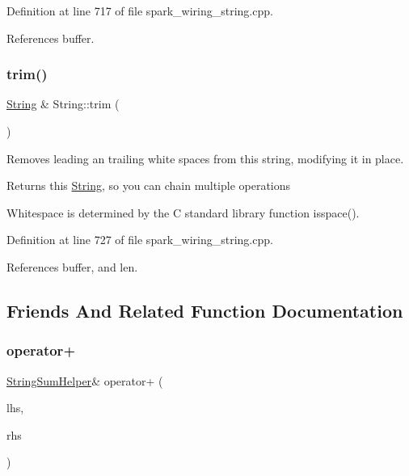 Definition at line 717 of file spark\+\_\+wiring\+\_\+string.\+cpp.



References buffer.

\mbox{\label{class_string_a7b9ef1226bef45dac72045042afc16e8}} 
\subsubsection{\texorpdfstring{trim()}{trim()}}
{\footnotesize\ttfamily \hyperlink{class_string}{String} \& String\+::trim (\begin{DoxyParamCaption}\item[{void}]{ }\end{DoxyParamCaption})}



Removes leading an trailing white spaces from this string, modifying it in place. 

\begin{DoxyReturn}{Returns}
this \hyperlink{class_string}{String}, so you can chain multiple operations
\end{DoxyReturn}
Whitespace is determined by the C standard library function isspace(). 

Definition at line 727 of file spark\+\_\+wiring\+\_\+string.\+cpp.



References buffer, and len.



\subsection{Friends And Related Function Documentation}
\mbox{\label{class_string_a2fb327465c18d4346465237d8a38938c}} 
\subsubsection{\texorpdfstring{operator+}{operator+}\hspace{0.1cm}{\footnotesize\ttfamily [1/10]}}
{\footnotesize\ttfamily \hyperlink{class_string_sum_helper}{String\+Sum\+Helper}\& operator+ (\begin{DoxyParamCaption}\item[{const \hyperlink{class_string_sum_helper}{String\+Sum\+Helper} \&}]{lhs,  }\item[{const \hyperlink{class_string}{String} \&}]{rhs }\end{DoxyParamCaption})\hspace{0.3cm}{\ttfamily [friend]}}



